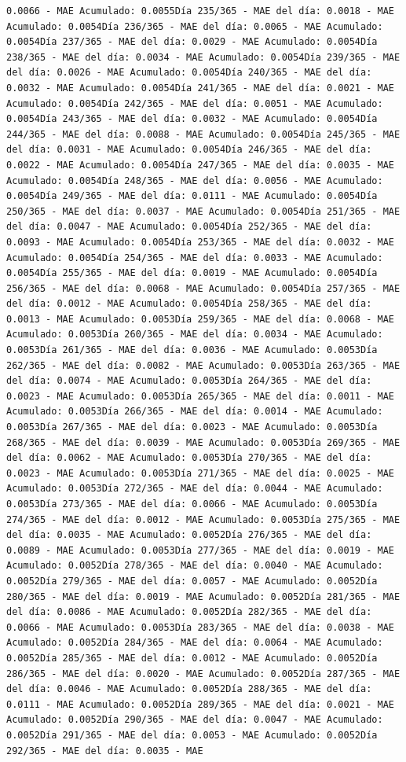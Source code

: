 \documentclass[
]{book}
\begin{document}
\begin{verbatim}
0.0066 - MAE Acumulado: 0.0055Día 235/365 - MAE del día: 0.0018 - MAE Acumulado: 0.0054Día 236/365 - MAE del día: 0.0065 - MAE Acumulado: 0.0054Día 237/365 - MAE del día: 0.0029 - MAE Acumulado: 0.0054Día 238/365 - MAE del día: 0.0034 - MAE Acumulado: 0.0054Día 239/365 - MAE del día: 0.0026 - MAE Acumulado: 0.0054Día 240/365 - MAE del día: 0.0032 - MAE Acumulado: 0.0054Día 241/365 - MAE del día: 0.0021 - MAE Acumulado: 0.0054Día 242/365 - MAE del día: 0.0051 - MAE Acumulado: 0.0054Día 243/365 - MAE del día: 0.0032 - MAE Acumulado: 0.0054Día 244/365 - MAE del día: 0.0088 - MAE Acumulado: 0.0054Día 245/365 - MAE del día: 0.0031 - MAE Acumulado: 0.0054Día 246/365 - MAE del día: 0.0022 - MAE Acumulado: 0.0054Día 247/365 - MAE del día: 0.0035 - MAE Acumulado: 0.0054Día 248/365 - MAE del día: 0.0056 - MAE Acumulado: 0.0054Día 249/365 - MAE del día: 0.0111 - MAE Acumulado: 0.0054Día 250/365 - MAE del día: 0.0037 - MAE Acumulado: 0.0054Día 251/365 - MAE del día: 0.0047 - MAE Acumulado: 0.0054Día 252/365 - MAE del día: 0.0093 - MAE Acumulado: 0.0054Día 253/365 - MAE del día: 0.0032 - MAE Acumulado: 0.0054Día 254/365 - MAE del día: 0.0033 - MAE Acumulado: 0.0054Día 255/365 - MAE del día: 0.0019 - MAE Acumulado: 0.0054Día 256/365 - MAE del día: 0.0068 - MAE Acumulado: 0.0054Día 257/365 - MAE del día: 0.0012 - MAE Acumulado: 0.0054Día 258/365 - MAE del día: 0.0013 - MAE Acumulado: 0.0053Día 259/365 - MAE del día: 0.0068 - MAE Acumulado: 0.0053Día 260/365 - MAE del día: 0.0034 - MAE Acumulado: 0.0053Día 261/365 - MAE del día: 0.0036 - MAE Acumulado: 0.0053Día 262/365 - MAE del día: 0.0082 - MAE Acumulado: 0.0053Día 263/365 - MAE del día: 0.0074 - MAE Acumulado: 0.0053Día 264/365 - MAE del día: 0.0023 - MAE Acumulado: 0.0053Día 265/365 - MAE del día: 0.0011 - MAE Acumulado: 0.0053Día 266/365 - MAE del día: 0.0014 - MAE Acumulado: 0.0053Día 267/365 - MAE del día: 0.0023 - MAE Acumulado: 0.0053Día 268/365 - MAE del día: 0.0039 - MAE Acumulado: 0.0053Día 269/365 - MAE del día: 0.0062 - MAE Acumulado: 0.0053Día 270/365 - MAE del día: 0.0023 - MAE Acumulado: 0.0053Día 271/365 - MAE del día: 0.0025 - MAE Acumulado: 0.0053Día 272/365 - MAE del día: 0.0044 - MAE Acumulado: 0.0053Día 273/365 - MAE del día: 0.0066 - MAE Acumulado: 0.0053Día 274/365 - MAE del día: 0.0012 - MAE Acumulado: 0.0053Día 275/365 - MAE del día: 0.0035 - MAE Acumulado: 0.0052Día 276/365 - MAE del día: 0.0089 - MAE Acumulado: 0.0053Día 277/365 - MAE del día: 0.0019 - MAE Acumulado: 0.0052Día 278/365 - MAE del día: 0.0040 - MAE Acumulado: 0.0052Día 279/365 - MAE del día: 0.0057 - MAE Acumulado: 0.0052Día 280/365 - MAE del día: 0.0019 - MAE Acumulado: 0.0052Día 281/365 - MAE del día: 0.0086 - MAE Acumulado: 0.0052Día 282/365 - MAE del día: 0.0066 - MAE Acumulado: 0.0053Día 283/365 - MAE del día: 0.0038 - MAE Acumulado: 0.0052Día 284/365 - MAE del día: 0.0064 - MAE Acumulado: 0.0052Día 285/365 - MAE del día: 0.0012 - MAE Acumulado: 0.0052Día 286/365 - MAE del día: 0.0020 - MAE Acumulado: 0.0052Día 287/365 - MAE del día: 0.0046 - MAE Acumulado: 0.0052Día 288/365 - MAE del día: 0.0111 - MAE Acumulado: 0.0052Día 289/365 - MAE del día: 0.0021 - MAE Acumulado: 0.0052Día 290/365 - MAE del día: 0.0047 - MAE Acumulado: 0.0052Día 291/365 - MAE del día: 0.0053 - MAE Acumulado: 0.0052Día 292/365 - MAE del día: 0.0035 - MAE 
\end{verbatim}
\end{document}

